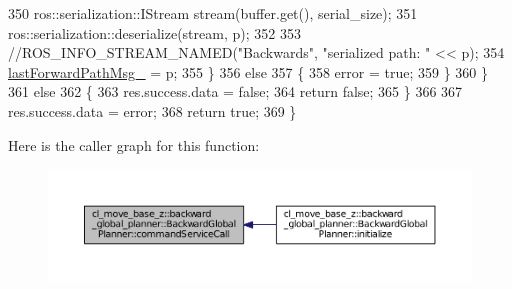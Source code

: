\begin{DoxyCode}
350             ros::serialization::IStream stream(buffer.get(), serial\_size);
351             ros::serialization::deserialize(stream, p);
352 
353             \textcolor{comment}{//ROS\_INFO\_STREAM\_NAMED("Backwards", "serialized path: " << p);}
354             \hyperlink{classcl__move__base__z_1_1backward__global__planner_1_1BackwardGlobalPlanner_a149ee7d22d98271c9ee1da55241d500b}{lastForwardPathMsg\_} = p;
355         \}
356         \textcolor{keywordflow}{else}
357         \{
358             error = \textcolor{keyword}{true};
359         \}
360     \}
361     \textcolor{keywordflow}{else}
362     \{
363         res.success.data = \textcolor{keyword}{false};
364         \textcolor{keywordflow}{return} \textcolor{keyword}{false};
365     \}
366 
367     res.success.data = error;
368     \textcolor{keywordflow}{return} \textcolor{keyword}{true};
369 \}
\end{DoxyCode}


Here is the caller graph for this function\+:
\nopagebreak
\begin{figure}[H]
\begin{center}
\leavevmode
\includegraphics[width=350pt]{classcl__move__base__z_1_1backward__global__planner_1_1BackwardGlobalPlanner_a9884ef48689e81be9a4b6d784c62ac01_icgraph}
\end{center}
\end{figure}


